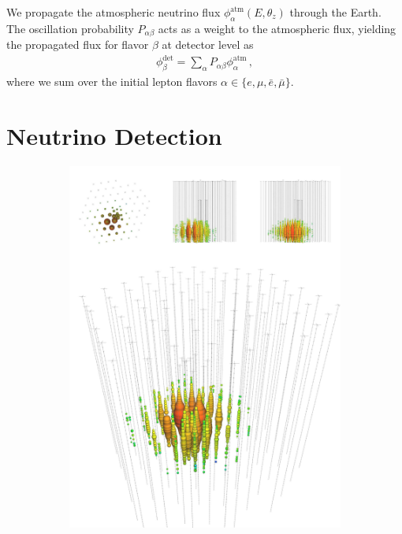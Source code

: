 We propagate the atmospheric neutrino flux $\phi_\alpha^\text{atm}(E,\theta_z)$ through the Earth.
The oscillation probability $P_{\alpha \beta}$ acts as a weight to the atmospheric flux, yielding the propagated flux for flavor $\beta$ at detector level as 
\begin{align}\label{eq:propFlux}
    \phi_\beta^\text{det} = \sum_\alpha P_{\alpha\beta} \phi_\alpha^\text{atm} \,,
\end{align}
where we sum over the initial lepton flavors $\alpha \in \{e,\mu, \bar{e}, \bar{\mu}\}$.

\section{Neutrino Detection}
\begin{figure}\label{fig:events}
    \begin{center}
        \begin{subfigure}{0.49\textwidth}
            \centering
            \includegraphics[clip, trim=0cm 0cm 0cm 30cm, width=1\textwidth]{figures/cascade_event.pdf}

\end{subfigure}
\end{center}
\end{figure}
